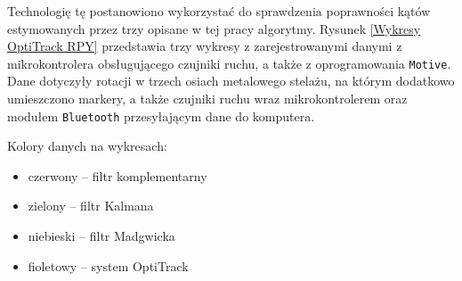 Technologię tę postanowiono wykorzystać do sprawdzenia poprawności kątów estymowanych przez trzy opisane w tej pracy algorytmy. Rysunek \ref{Wykresy OptiTrack RPY} przedstawia trzy wykresy z zarejestrowanymi danymi z mikrokontrolera obsługującego czujniki ruchu, a także z oprogramowania \texttt{Motive}. Dane dotyczyły rotacji w trzech osiach metalowego stelażu, na którym dodatkowo umieszczono markery, a także czujniki ruchu wraz mikrokontrolerem oraz modułem \texttt{Bluetooth} przesyłającym dane do komputera. 

Kolory danych na wykresach:
\begin{itemize}
    \item czerwony -- filtr komplementarny
    \item zielony -- filtr Kalmana
    \item niebieski -- filtr Madgwicka
    \item fioletowy -- system OptiTrack
\end{itemize}

